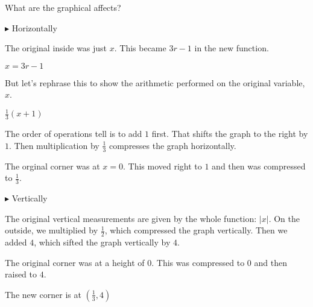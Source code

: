 \documentclass{ximera}
\begin{document}
\begin{example}
\begin{image}
\end{image}





What are the graphical affects?


$\blacktriangleright$ Horizontally

The original inside was just $x$.  This became $3r-1$ in the new function.   

$x = 3r - 1$

But let's rephrase this to show the arithmetic performed on the original variable, $x$.

$\frac{1}{3} (x + 1)$

The order of operations tell is to add $1$ first.  That shifts the graph to the right by $1$.  Then multiplication by $\frac{1}{3}$ compresses the graph horizontally.

The orginal corner was at $x=0$.  This moved right to $1$ and then was compressed to $\frac{1}{3}$.



$\blacktriangleright$ Vertically

The original vertical measurements are given by the whole function: $|x|$.  On the outside, we multiplied by $\frac{1}{2}$, which compressed the graph vertically.  Then we added $4$, which sifted the graph vertically by $4$.

The original corner was at a height of $0$.  This was compressed to $0$ and then raised to $4$.

The new corner is at $\left( \frac{1}{3}, 4 \right)$






\end{example}
\end{document}

